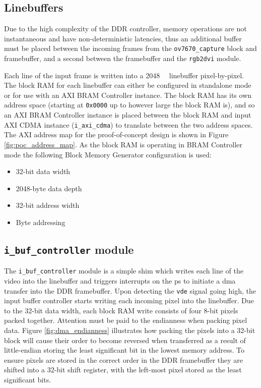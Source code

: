 \subsection{Linebuffers}
Due to the high complexity of the DDR controller, memory operations are not instantaneous and have non-deterministic latencies, thus an additional buffer must be placed between the incoming frames from the \texttt{ov7670\_capture} block and framebuffer, and a second between the framebuffer and the \texttt{rgb2dvi} module.

Each line of the input frame is written into a \SI{2048}{\kilo\byte} linebuffer pixel-by-pixel. The block RAM for each linebuffer can either be configured in standalone mode or for use with an AXI BRAM Controller instance. The block RAM has its own address space (starting at \texttt{0x0000} up to however large the block RAM is), and so an AXI BRAM Controller instance is placed between the block RAM and input AXI CDMA instance (\texttt{i\_axi\_cdma}) to translate between the two address spaces. The AXI address map for the proof-of-concept design is shown in Figure \ref{fig:poc_address_map}. As the block RAM is operating in BRAM Controller mode the following Block Memory Generator configuration is used:
\begin{itemize}
  \item 32-bit data width
  \item 2048-byte data depth
  \item 32-bit address width
  \item Byte addressing
\end{itemize}

\subsection{\texttt{i\_buf\_controller} module}
The \texttt{i\_buf\_controller} module is a simple shim which writes each line of the video into the linebuffer and triggers interrupts on the \gls{ps} to initiate a \gls{dma} transfer into the DDR framebuffer. Upon detecting the \texttt{vde} signal going high, the input buffer controller starts writing each incoming pixel into the linebuffer. Due to the 32-bit data width, each block RAM write consists of four 8-bit pixels packed together. Attention must be paid to the endianness when packing pixel data. Figure \ref{fig:dma_endianness} illustrates how packing the pixels into a 32-bit block will cause their order to become reversed when transferred as a result of little-endian storing the least significant bit in the lowest memory address. To ensure pixels are stored in the correct order in the DDR framebuffer they are shifted into a 32-bit shift register, with the left-most pixel stored as the least significant bits.

